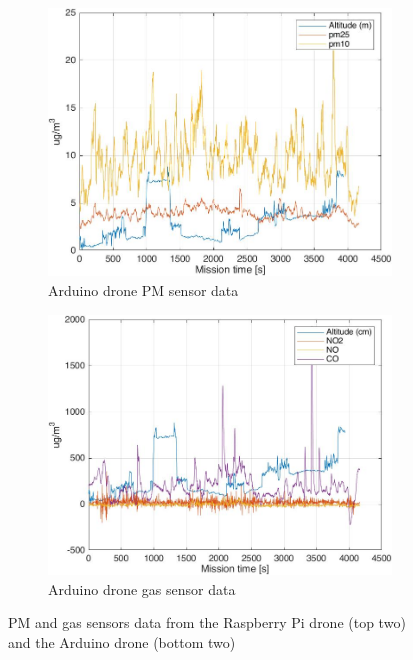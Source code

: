 \begin{figure}
    \centering
    \begin{subfigure}[b]{0.45\textwidth}
        \centering
        \includegraphics[width=\textwidth]{images/flight-data/arduino/pms.jpg}
        \caption{Arduino drone PM sensor data}
        \label{fig:pms}
    \end{subfigure}
    \hfill
    \begin{subfigure}[b]{0.45\textwidth}
        \centering
        \includegraphics[width=\textwidth]{images/flight-data/arduino/ariasensors.jpg}
        \caption{Arduino drone gas sensor data}
        \label{fig:ariasensors}
    \end{subfigure}
    \hfill
       \caption{PM and gas sensors data from the Raspberry Pi drone (top two) and the Arduino drone (bottom two)}
       \label{fig:pms-and-sensors}
\end{figure}


